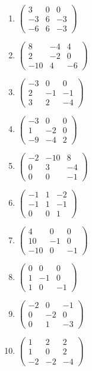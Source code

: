 \begin{enumerate}[label=\arabic*., leftmargin=*]
\item $\begin{pmatrix}3 & 0 & 0\\ -3 & 6 & -3\\ -6 & 6 & -3\end{pmatrix}$
\item $\begin{pmatrix}8 & -4 & 4\\ 2 & -2 & 0\\ -10 & 4 & -6\end{pmatrix}$
\item $\begin{pmatrix}-3 & 0 & 0\\ 2 & -1 & -1\\ 3 & 2 & -4\end{pmatrix}$
\item $\begin{pmatrix}-3 & 0 & 0\\ 1 & -2 & 0\\ -9 & -4 & 2\end{pmatrix}$
\item $\begin{pmatrix}-2 & -10 & 8\\ 0 & 3 & -4\\ 0 & 0 & -1\end{pmatrix}$
\item $\begin{pmatrix}-1 & 1 & -2\\ -1 & 1 & -1\\ 0 & 0 & 1\end{pmatrix}$
\item $\begin{pmatrix}4 & 0 & 0\\ 10 & -1 & 0\\ -10 & 0 & -1\end{pmatrix}$
\item $\begin{pmatrix}0 & 0 & 0\\ 1 & -1 & 0\\ 1 & 0 & -1\end{pmatrix}$
\item $\begin{pmatrix}-2 & 0 & -1\\ 0 & -2 & 0\\ 0 & 1 & -3\end{pmatrix}$
\item $\begin{pmatrix}1 & 2 & 2\\ 1 & 0 & 2\\ -2 & -2 & -4\end{pmatrix}$

\end{enumerate}
